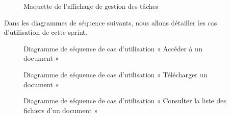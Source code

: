 \begin{figure}[H]
  \centering
  \caption{Maquette de l'affichage de gestion des tâches}
  \label{fig:design_manage_tasks}
\end{figure}

Dans les diagrammes de séquence suivants, nous allons détailler les cas d'utilisation de cette sprint.\\

\begin{figure}[H]
  \centering
  \caption{Diagramme de séquence de cas d'utilisation « Accéder à un document  »}
  \label{fig:sequence_Accederaundocument}
\end{figure}
\begin{figure}[H]
  \centering
  \caption{Diagramme de séquence de cas d'utilisation « Télécharger un document  »}
  \label{fig:sequence_telechargerundocument}
\end{figure}
\begin{figure}[H]
  \centering
  \caption{Diagramme de séquence de cas d'utilisation « Consulter la liste des fichiers d'un document  »}
  \label{fig:sequence_previewFiles}
\end{figure}

